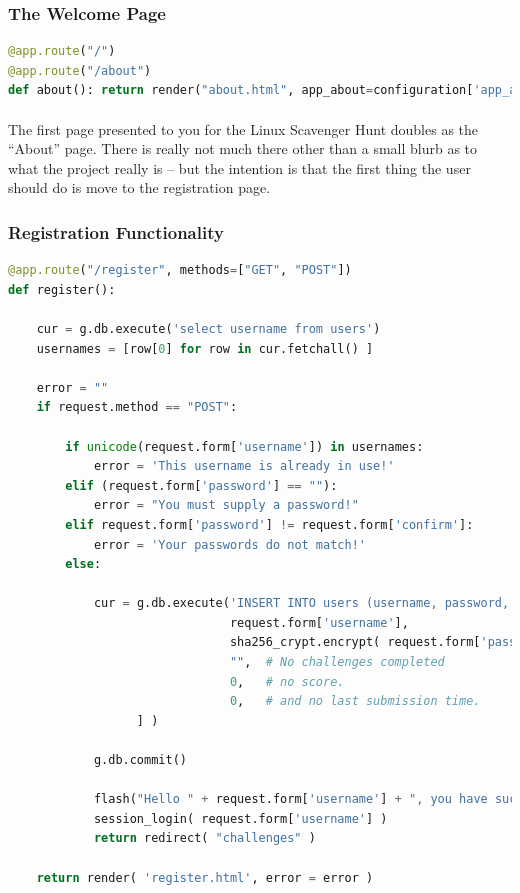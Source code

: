 \documentclass[11pt]{article}
\begin{document}
	\newpage

	\subsubsection{The Welcome Page}

	\begin{lstlisting}[language=Python]
@app.route("/")
@app.route("/about")
def about(): return render("about.html", app_about=configuration['app_about'])
\end{lstlisting}

	\paragraph{} The first page presented to you for the Linux Scavenger Hunt doubles as the ``About'' page. There is really not much there other than a small blurb as to what the project really is -- but the intention is that the first thing the user should do is move to the registration page.

	\subsubsection{Registration Functionality}

	\begin{lstlisting}[language=Python]
@app.route("/register", methods=["GET", "POST"])
def register():

	cur = g.db.execute('select username from users')
	usernames = [row[0] for row in cur.fetchall() ]

	error = ""
	if request.method == "POST":

		if unicode(request.form['username']) in usernames:
			error = 'This username is already in use!'
		elif (request.form['password'] == ""):
			error = "You must supply a password!"
		elif request.form['password'] != request.form['confirm']:
			error = 'Your passwords do not match!'
		else:

			cur = g.db.execute('INSERT INTO users (username, password, solved_challenges, score, last_submission) VALUES ( ?, ?, ?, ?, ? )', [ 
				               request.form['username'], 
				               sha256_crypt.encrypt( request.form['password']),
				               "",  # No challenges completed
				               0,   # no score.
				               0,   # and no last submission time.
				  ] )

			g.db.commit()

			flash("Hello " + request.form['username'] + ", you have successfully registered!")
			session_login( request.form['username'] )
			return redirect( "challenges" )

	return render( 'register.html', error = error )
\end{lstlisting}
\end{document}
